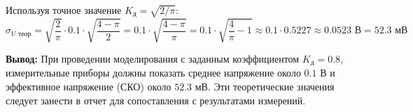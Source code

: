 Используя точное значение $K_{\text{д}} = \sqrt{2/\pi}$:
\begin{equation*}
    \sigma_{U\text{ теор}} = \sqrt{\frac{2}{\pi}} \cdot 0.1 \cdot \sqrt{\frac{4 - \pi}{2}} = 0.1 \cdot \sqrt{\frac{4 - \pi}{\pi}} = 0.1 \cdot \sqrt{\frac{4}{\pi} - 1} \approx 0.1 \cdot 0.5227 \approx 0.0523 \text{ В} = 52.3 \text{ мВ}
\end{equation*}

\textbf{Вывод:} При проведении моделирования с заданным коэффициентом $K_{\text{д}} = 0.8$, измерительные приборы должны показать среднее напряжение около $0.1 \text{ В}$ и эффективное напряжение (СКО) около $52.3 \text{ мВ}$. Эти теоретические значения следует занести в отчет для сопоставления с результатами измерений.